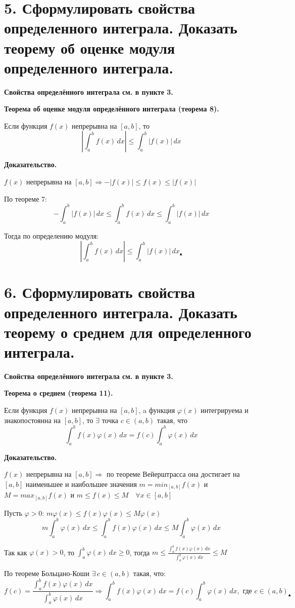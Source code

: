\documentclass[11pt]{article}
\begin{document}
\section*{5. Сформулировать свойства определенного интеграла. Доказать теорему об оценке модуля определенного интеграла.}
\par\textbf{Свойства определённого интеграла см. в пункте 3.}
\par\textbf{Теорема об оценке модуля определённого интеграла (теорема 8).}
\par Если функция $f(x)$ непрерывна на $[a, b]$, то $$\left| \int_{a}^b f(x) \, dx \right| \leq \int_{a}^b |f(x)| \, dx$$
\par\textbf{Доказательство.}
\par $f(x)$ непрерывна на $[a, b] \Rightarrow -|f(x)| \leq f(x) \leq |f(x)|$
\par По теореме 7: $$- \int_{a}^b |f(x)| \, dx \leq \int_{a}^b f(x) \, dx \leq \int_{a}^b |f(x)| \, dx$$
\par Тогда по определению модуля: $$\left| \int_{a}^b f(x) \, dx \right| \leq \int_{a}^b |f(x)| \, dx _{\blacktriangle}$$

\section*{6. Сформулировать свойства определенного интеграла. Доказать теорему о среднем для определенного интеграла.}
\par\textbf{Свойства определённого интеграла см. в пункте 3.}
\par\textbf{Теорема о среднем (теорема 11).}
\par Если функция $f(x)$ непрерывна на $[a, b]$, a функция $\varphi(x)$ интегрируема и знакопостоянна на $[a, b]$, то $\exists$ точка $c \in (a, b)$ такая, что $$\int_{a}^b f(x)\varphi(x) \, dx = f(c) \int_{a}^b \varphi(x) \, dx$$
\par\textbf{Доказательство.}
\par $f(x)$ непрерывна на $[a, b] \Rightarrow$ по теореме Вейерштрасса она достигает на  $[a, b]$ наименьшее и наибольшее значения $m = min_{[a, b]} f(x)$ и $M = max_{[a, b]} f(x)$ и $m \leq f(x) \leq M \quad \forall x \in [a, b]$
\par Пусть $\varphi > 0$:
$m \varphi(x) \leq f(x) \varphi(x) \leq M \varphi(x)$
$$m \int_{a}^b \varphi(x) \, dx  \leq \int_{a}^b f(x) \varphi(x) \, dx \leq M \int_{a}^b \varphi(x) \, dx$$
\par Так как $\varphi(x) > 0$, то $\int_{a}^b \varphi(x) \, dx \geq 0$, тогда $m \leq  \frac{{\int_{a}^b f(x) \varphi(x) \, dx}}{\int_{a}^b \varphi(x) \, dx} \leq M$
\par По теореме Больцано-Коши $\exists \, c \in (a, b)$ такая, что:
$$f(c) = \frac{{\int_{a}^b f(x) \varphi(x) \, dx}}{\int_{a}^b \varphi(x) \, dx} \Rightarrow \int_{a}^b f(x) \varphi(x) \, dx = f(c) \int_{a}^b \varphi(x) \, dx, \text{ где } c \in (a, b) _{\blacktriangle}$$
\end{document}
